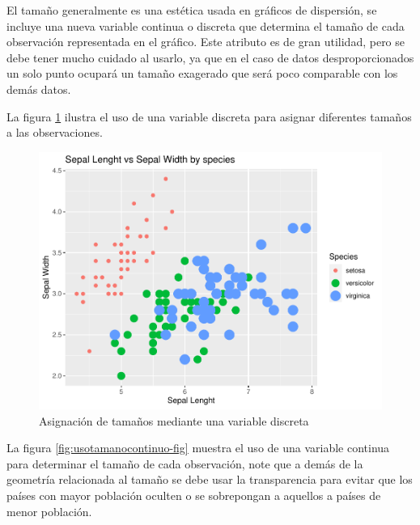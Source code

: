 \documentclass[
]{book}
\begin{document}
El tamaño generalmente es una estética usada en gráficos de dispersión, se incluye una nueva variable continua o discreta que determina el tamaño de cada observación representada en el gráfico. Este atributo es de gran utilidad, pero se debe tener mucho cuidado al usarlo, ya que en el caso de datos desproporcionados un solo punto ocupará un tamaño exagerado que será poco comparable con los demás datos.

La figura \ref{fig:usotamanodiscreto-fig} ilustra el uso de una variable discreta para asignar diferentes tamaños a las observaciones.

\begin{figure}

{\centering \includegraphics[width=0.8\linewidth]{Lineamientos-Visualizar_files/figure-latex/usotamanodiscreto-fig-1} 

}

\caption{Asignación de tamaños mediante una variable discreta}\label{fig:usotamanodiscreto-fig}
\end{figure}

La figura \ref{fig:usotamanocontinuo-fig} muestra el uso de una variable continua para determinar el tamaño de cada observación, note que a demás de la geometría relacionada al tamaño se debe usar la transparencia para evitar que los países con mayor población oculten o se sobrepongan a aquellos a países de menor población.
\end{document}
